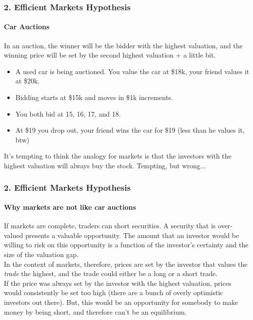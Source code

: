 \documentclass{beamer}
\begin{document}
\begin{frame}[t]
    \frametitle{2. Efficient Markets Hypothesis}
    \framesubtitle{Car Auctions}

    In an auction, the winner will be the bidder with the highest valuation,
     and the winning price will be set by the second highest valuation + a little bit.
    \begin{itemize}
        \item A used car is being auctioned.   You value the car at \$18k, your friend 
        values it at \$20k.
        \item Bidding starts at \$15k and moves in \$1k increments.  
        \item You both bid at 15, 16, 17, and 18.
        \item At \$19 you drop out, your friend wins the car for \$19 (less than he values it, btw)
    \end{itemize}
    
    It's tempting to think the analogy for markets is that the investors with the highest valuation will 
    always buy the stock.   Tempting, but wrong...

\end{frame}

\begin{frame}[t]
    \frametitle{2. Efficient Markets Hypothesis}
    \framesubtitle{Why markets are not like car auctions}

    If markets are complete, traders can short securities.   A security that is over-valued presents 
    a valuable opportunity.   The amount that an investor would be willing to risk on this opportunity 
    is a function of the investor's certainty and the size of the valuation gap.\\
    \vspace{1em}
    In the context of markets, therefore, prices are set by the investor that values the \textit{trade} 
    the highest, and the trade could either be a long or a short trade.\\
    \vspace{1em}
    If the price was always set by the investor with the highest valuation, prices would consistently be 
    set too high (there are a bunch of overly optimistic investors out there).   But, this would be an 
    opportunity for somebody to make money by being short, and therefore can't be an equilibrium.

\end{frame}
\end{document}
